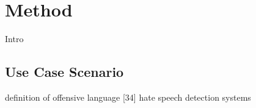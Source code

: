 \section{Method}
Intro

\subsection{Use Case Scenario}
definition of offensive language [34] \newline
hate speech detection systems \newline







